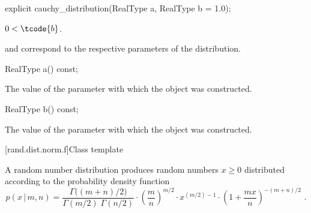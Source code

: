 %
\begin{itemdecl}
explicit cauchy_distribution(RealType a, RealType b = 1.0);
\end{itemdecl}

\begin{itemdescr}
\pnum
\expects
$0 < \tcode{b}$.

\pnum
\remarks
{} and 
correspond to the respective parameters of the distribution.
\end{itemdescr}

\begin{indexed}{}
\begin{itemdecl}
RealType a() const;
\end{itemdecl}
\end{indexed}

\begin{itemdescr}
\pnum
\returns
The value of the  parameter
 with which the object was constructed.
\end{itemdescr}

\begin{indexed}{}
\begin{itemdecl}
RealType b() const;
\end{itemdecl}
\end{indexed}

\begin{itemdescr}
\pnum
\returns
The value of the  parameter
 with which the object was constructed.
\end{itemdescr}


[rand.dist.norm.f]{Class template }%
%
%

\pnum
A  random number distribution
produces random numbers $x \ge 0$
distributed according to
the probability density function%
%
%
\[ p(x\,|\,m,n) = \frac{\Gamma\big((m+n)/2\big)}{\Gamma(m/2) \; \Gamma(n/2)}
     \cdot \left(\frac{m}{n}\right)^{m/2}
     \cdot x^{(m/2)-1}
     \cdot \left(1 + \frac{m x}{n}\right)^{-(m + n)/2}
     \text{ .} \]


